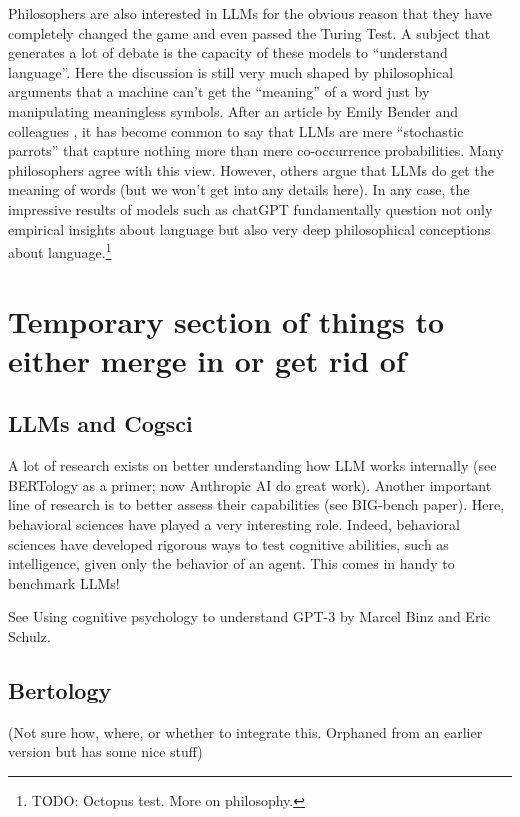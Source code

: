 Philosophers are also interested in LLMs for the obvious reason that they have completely changed the game and even passed the Turing Test. A subject that generates a lot of debate is the capacity of these models to ``understand language''. Here the discussion is still very much shaped by philosophical arguments that a machine can’t get the ``meaning'' of a word just by manipulating meaningless symbols. After an article by Emily Bender and colleagues \cite{bender2021dangers}, it has become common to say that LLMs are mere ``stochastic parrots'' that capture nothing more than mere co-occurrence probabilities. Many philosophers agree with this view. However, others argue that LLMs do get the meaning of words (but we won’t get into any details here). In any case, the impressive results of models such as chatGPT fundamentally question not only empirical insights about language but also very deep philosophical conceptions about language.\footnote{TODO: Octopus test. More on philosophy.}

\section{Temporary section of things to either merge in or get rid of}

\subsection{LLMs and Cogsci}

A lot of research exists on better understanding how LLM works internally (see BERTology as a primer; now Anthropic AI do great work). Another important line of research is to better assess their capabilities (see BIG-bench paper). Here, behavioral sciences have played a very interesting role. Indeed, behavioral sciences have developed rigorous ways to test cognitive abilities, such as intelligence, given only the behavior of an agent. This comes in handy to benchmark LLMs!

See Using cognitive psychology to understand GPT-3 by Marcel Binz and Eric Schulz.

\subsection{Bertology}

(Not sure how, where, or whether to integrate this. Orphaned from an earlier version but has some nice stuff)

